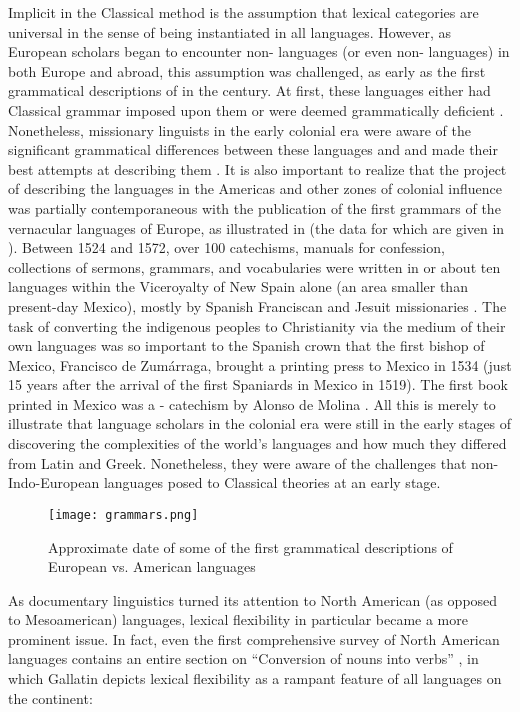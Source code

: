 Implicit in the Classical method is the assumption that lexical categories are universal in the sense of being instantiated in all languages. However, as European scholars began to encounter non- languages (or even non- languages) in both Europe and abroad, this assumption was challenged, as early as the first grammatical descriptions of  in the  century. At first, these languages either had Classical grammar imposed upon them or were deemed grammatically deficient \parencite[3]{Suarez1983}. Nonetheless, missionary linguists in the early colonial era were aware of the significant grammatical differences between these languages and  and made their best attempts at describing them \parencite[3--4]{Suarez1983}. It is also important to realize that the project of describing the languages in the Americas and other zones of colonial influence was partially contemporaneous with the publication of the first grammars of the vernacular languages of Europe, as illustrated in  (the data for which are given in ). Between 1524 and 1572, over 100 catechisms, manuals for confession, collections of sermons, grammars, and vocabularies were written in or about ten languages within the Viceroyalty of New Spain alone (an area smaller than present-day Mexico), mostly by Spanish Franciscan and Jesuit missionaries \parencite[2]{Suarez1983}. The task of converting the indigenous peoples to Christianity via the medium of their own languages was so important to the Spanish crown that the first bishop of Mexico, Francisco de Zumárraga, brought a printing press to Mexico in 1534 (just 15 years after the arrival of the first Spaniards in Mexico in 1519). The first book printed in Mexico was a - catechism by Alonso de Molina \parencite[2]{Suarez1983}. All this is merely to illustrate that language scholars in the colonial era were still in the early stages of discovering the complexities of the world's languages and how much they differed from Latin and Greek. Nonetheless, they were aware of the challenges that non-Indo-European languages posed to Classical theories at an early stage.

\begin{figure}
  \texttt{[image: grammars.png]}
  \caption{Approximate date of some of the first grammatical descriptions of European vs. American languages}
  \label{fig:grammars}
\end{figure}

As documentary linguistics turned its attention to North American (as opposed to Mesoamerican) languages, lexical flexibility in particular became a more prominent issue. In fact, even the first comprehensive survey of North American languages contains an entire section on \enquote{Conversion of nouns into verbs} \parencite[174--177]{Gallatin1836}, in which Gallatin depicts lexical flexibility as a rampant feature of all languages on the continent:

